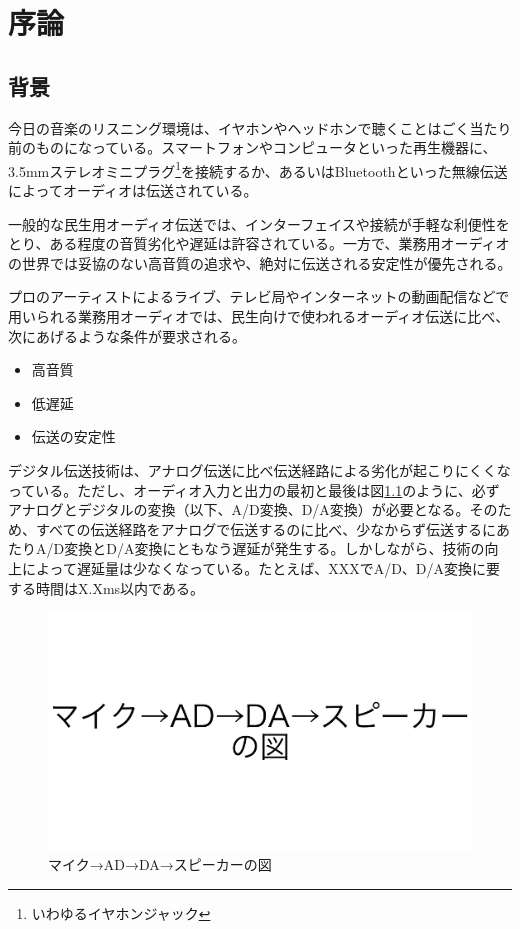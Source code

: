 \chapter{序論}
\label{chap:introduction}

\section{背景}
\label{section:background}

今日の音楽のリスニング環境は、イヤホンやヘッドホンで聴くことはごく当たり前のものになっている。スマートフォンやコンピュータといった再生機器に、3.5mmステレオミニプラグ\footnote{いわゆるイヤホンジャック}を接続するか、あるいはBluetoothといった無線伝送によってオーディオは伝送されている。

一般的な民生用オーディオ伝送では、インターフェイスや接続が手軽な利便性をとり、ある程度の音質劣化や遅延は許容されている。一方で、業務用オーディオの世界では妥協のない高音質の追求や、絶対に伝送される安定性が優先される。

プロのアーティストによるライブ、テレビ局やインターネットの動画配信などで用いられる業務用オーディオでは、民生向けで使われるオーディオ伝送に比べ、次にあげるような条件が要求される。

\begin{itemize}
  \item 高音質
  \item 低遅延
  \item 伝送の安定性
\end{itemize}

デジタル伝送技術は、アナログ伝送に比べ伝送経路による劣化が起こりにくくなっている。ただし、オーディオ入力と出力の最初と最後は図\ref{fig:first_and_last_need_ad_da}のように、必ずアナログとデジタルの変換（以下、A/D変換、D/A変換）が必要となる。そのため、すべての伝送経路をアナログで伝送するのに比べ、少なからず伝送するにあたりA/D変換とD/A変換にともなう遅延が発生する。しかしながら、技術の向上によって遅延量は少なくなっている。たとえば、XXXでA/D、D/A変換に要する時間はX.Xms以内である。

\begin{figure}[htbp]
  \centering
  \label{fig:first_and_last_need_ad_da}
  \includegraphics[width=0.8\linewidth]{img/first_and_last_need_ad_da.pdf}
  \caption{マイク→AD→DA→スピーカーの図}
\end{figure}

